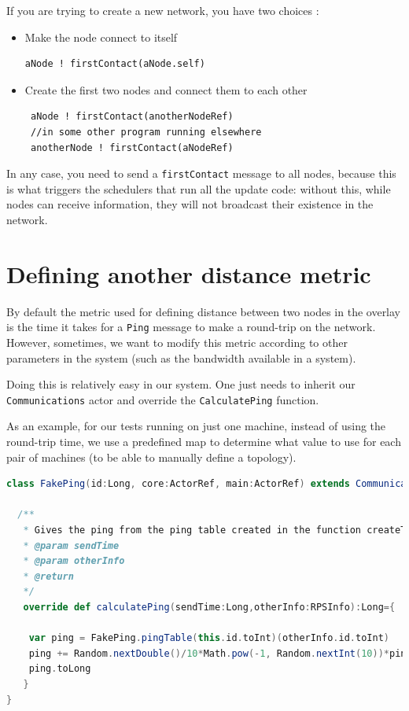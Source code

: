 \documentclass[11pt,a4paper]{article}
\begin{document}
 If you are trying to create a new network, you have two choices : 
 
 \begin{itemize}
    \item Make the node connect to itself 
    \begin{lstlisting}
aNode ! firstContact(aNode.self)
    \end{lstlisting}
 	\item Create the first two nodes and connect them to each other 
 	\begin{lstlisting}
 aNode ! firstContact(anotherNodeRef)
 //in some other program running elsewhere
 anotherNode ! firstContact(aNodeRef)
 	\end{lstlisting}
 \end{itemize}
 
 In any  case, you need to send a \verb|firstContact| message to all nodes, because this is what triggers the schedulers that run all the update code: without this, while nodes can receive information, they will not broadcast their existence in the network.
 

\section{Defining another distance metric}

By default the metric used for defining distance between two nodes in the overlay is the time it takes for a \verb|Ping| message to make a round-trip on the network. However, sometimes, we want to modify this metric according to other parameters in the system (such as the bandwidth available in a system).

Doing this is relatively easy in our system. One just needs to inherit our \verb|Communications| actor and override the \verb|CalculatePing|  function.

As an example, for our tests running on just one machine, instead of using the round-trip time, we use a predefined map to determine what value to use for each pair of machines (to be able to manually define a topology).

\begin{lstlisting}[language=scala]
class FakePing(id:Long, core:ActorRef, main:ActorRef) extends Communication(id, core, main) {

  /**
   * Gives the ping from the ping table created in the function createTable
   * @param sendTime
   * @param otherInfo
   * @return
   */
   override def calculatePing(sendTime:Long,otherInfo:RPSInfo):Long={

    var ping = FakePing.pingTable(this.id.toInt)(otherInfo.id.toInt)
    ping += Random.nextDouble()/10*Math.pow(-1, Random.nextInt(10))*ping
    ping.toLong
   }
}
\end{lstlisting}
\end{document}
